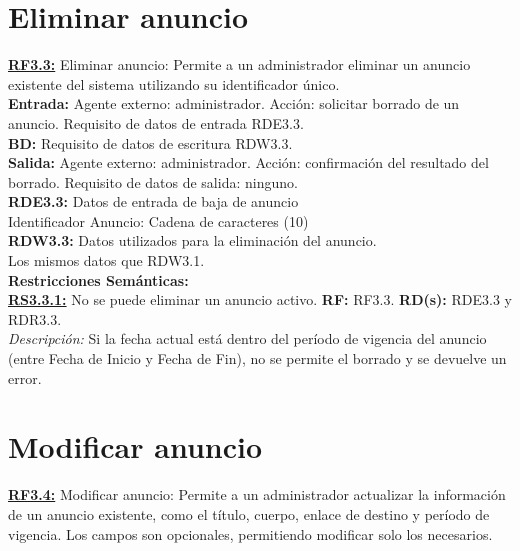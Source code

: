 \section{Eliminar anuncio}
\textbf{\textcolor{rojo}{\underline{RF3.3:}}} Eliminar anuncio: Permite a un administrador eliminar un anuncio existente del sistema utilizando su identificador único. \\[6pt]

\textbf{\textcolor{rojo}{Entrada:}} Agente externo: administrador. Acción: solicitar borrado de un anuncio. 
Requisito de datos de entrada \textcolor{azul}{RDE3.3}. \\[6pt]

\textbf{\textcolor{rojo}{BD:}} Requisito de datos de escritura \textcolor{azul}{RDW3.3}. \\[6pt]

\textbf{\textcolor{rojo}{Salida:}} Agente externo: administrador. Acción: confirmación del resultado del borrado. 
Requisito de datos de salida: ninguno. \\[12pt]

\textcolor{azul}{\textbf{RDE3.3:}} Datos de entrada de baja de anuncio \\
\hspace*{1cm} Identificador Anuncio: Cadena de caracteres (10) \\[12pt]


\textcolor{azul}{\textbf{RDW3.3:}} Datos utilizados para la eliminación del anuncio. \\
\hspace*{1cm} Los mismos datos que RDW3.1. \\[12pt] 

\textbf{\textcolor{verde}{Restricciones Semánticas:}} \\[6pt]
\textbf{\textcolor{verde}{\underline{RS3.3.1:}}} No se puede eliminar un anuncio activo. \textbf{RF:} RF3.3. \textbf{RD(s):} RDE3.3 y RDR3.3. \\
\hspace*{1cm} \textit{Descripción:} Si la fecha actual está dentro del período de vigencia del anuncio (entre Fecha de Inicio y Fecha de Fin), no se permite el borrado y se devuelve un error.

\section{Modificar anuncio}
\textbf{\textcolor{rojo}{\underline{RF3.4:}}} Modificar anuncio: Permite a un administrador actualizar la información de un anuncio existente, como el título, cuerpo, enlace de destino y período de vigencia. Los campos son opcionales, permitiendo modificar solo los necesarios. \\[6pt]

